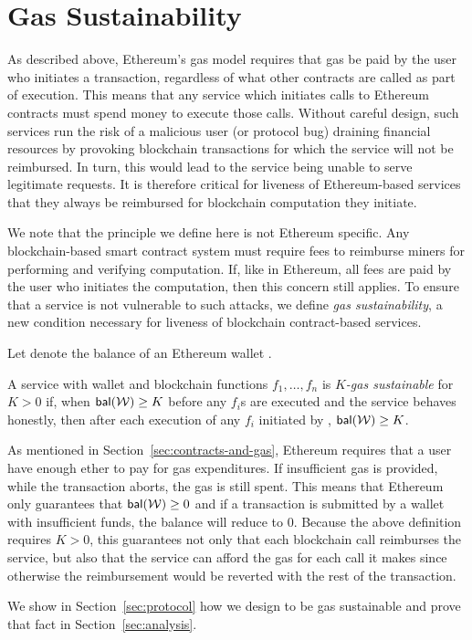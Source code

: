 \section{Gas Sustainability}
\label{sec:gas-sustainability}

As described above, Ethereum's gas model requires that gas be paid by the user who initiates a transaction, regardless of what other contracts are called as part of execution.
This means that any service which initiates calls to Ethereum contracts must spend money to execute those calls.
Without careful design, such services run the risk of a malicious user (or protocol bug) draining financial resources by provoking blockchain transactions for which the service will not be reimbursed.
In turn, this would lead to the service being unable to serve legitimate requests.
It is therefore critical for liveness of Ethereum-based services that they always be reimbursed for blockchain computation they initiate.

We note that the principle we define here is not Ethereum specific.
Any blockchain-based smart contract system must require fees to reimburse miners for performing and verifying computation.
If, like in Ethereum, all fees are paid by the user who initiates the computation, then this concern still applies.
To ensure that a service is not vulnerable to such attacks, we define \emph{gas sustainability}, a new condition necessary for liveness of blockchain contract-based services.

Let \bal{\wallet} denote the balance of an Ethereum wallet \wallet.

\begin{definition}
  \label{def:gas-sustainability}
  A service with wallet \wallet and blockchain functions $f_1, \dotsc, f_n$ is \emph{$K$-gas sustainable} for $K > 0$ if,
  when $\bal{\wallet} \geq K$ before any $f_i$s are executed and the service behaves honestly,
  then after each execution of any $f_i$ initiated by \wallet, $\bal{\wallet} \geq K$.
\end{definition}

As mentioned in Section~\ref{sec:contracts-and-gas}, Ethereum requires that a user have enough ether to pay for gas expenditures.
If insufficient gas is provided, while the transaction aborts, the gas is still spent.
This means that Ethereum only guarantees that $\bal{\wallet} \geq 0$ and if a transaction is submitted by a wallet with insufficient funds, the balance will reduce to 0.
Because the above definition requires $K > 0$, this guarantees not only that each blockchain call reimburses the service,
but also that the service can afford the gas for each call it makes since otherwise the reimbursement would be reverted with the rest of the transaction.

We show in Section~\ref{sec:protocol} how we design \tc to be gas sustainable and prove that fact in Section~\ref{sec:analysis}.

